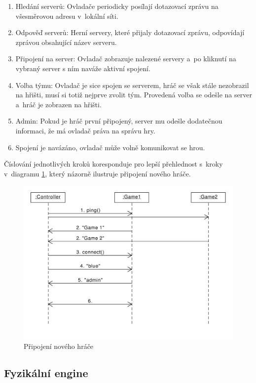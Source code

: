 \documentclass[thesis=B,czech,hidelinks]{FITthesis}[2012/06/26] %
\begin{document}
\begin{enumerate}
	\item Hledání serverů: Ovladače periodicky posílají dotazovací zprávu na všesměrovou adresu v~lokální síti.
	\item Odpověď serverů: Herní servery, které přijaly dotazovací zprávu, odpovídají zprávou obsahující název serveru.
	\item Připojení na server: Ovladač zobrazuje nalezené servery a~po kliknutí na vybraný server s ním naváže aktivní spojení.
	\item Volba týmu: Ovladač je sice spojen se serverem, hráč se však stále nezobrazil na hřišti, musí si totiž nejprve zvolit tým. Provedená volba se odešle na server a~hráč je zobrazen na hřišti.
	\item Admin: Pokud je hráč první připojený, server mu odešle dodatečnou informaci, že má ovladač práva na správu hry.
	\item Spojení je navázáno, ovladač může volně komunikovat se hrou.
\end{enumerate}

Číslování jednotlivých kroků koresponduje pro lepší přehlednost s~kroky v~diagramu \ref{picture:connection}, který názorně ilustruje připojení nového hráče. 

\begin{figure}[h]
\includegraphics[width=\textwidth]{connection}
\caption{Připojení nového hráče}
\label{picture:connection}
\end{figure}

\subsection{Fyzikální engine}
\end{document}
